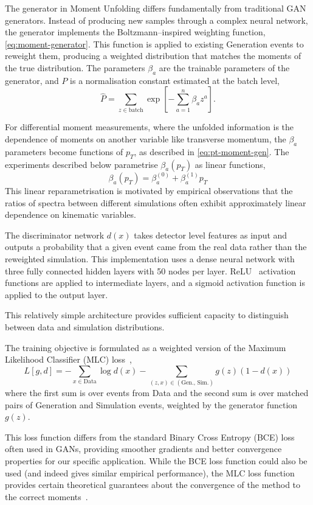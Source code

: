     The generator in Moment Unfolding differs fundamentally from traditional GAN generators.
    Instead of producing new samples through a complex neural network, the generator implements the Boltzmann--inspired weighting function, \cref{eq:moment-generator}.
    This function is applied to existing Generation events to reweight them, producing a weighted distribution that matches the moments of the true distribution.
    The parameters $\beta_a$ are the trainable parameters of the generator, and $P$ is a normalisation constant estimated at the batch level,
    \[
        \hat P = \sum_{z \in \text{batch}} \exp\left[-\sum_{a=1}^n\beta_a z^a\right].
    \]

    For differential moment measurements, where the unfolded information is the dependence of moments on another variable like transverse momentum, the $\beta_a$ parameters become functions of $p_T$, as described in \cref{eq:pt-moment-gen}.
    The experiments described below parametrise $\beta_a(p_T)$ as linear functions, 
    \[
        \beta_a(p_T) = \beta_a^{(0)} + \beta_a^{(1)}p_T
    \]
    This linear reparametrisation is motivated by empirical observations that the ratios of spectra between different simulations often exhibit approximately linear dependence on kinematic variables.

    The discriminator network $d(x)$ takes detector level features as input and outputs a probability that a given event came from the real data rather than the reweighted simulation.
    This implementation uses a dense neural network with three fully connected hidden layers with 50 nodes per layer.
    ReLU~\cite{Householder1941ALemmas} activation functions are applied to intermediate layers, and a sigmoid activation function is applied to the output layer.

    This relatively simple architecture provides sufficient capacity to distinguish between data and simulation distributions.

    The training objective is formulated as a weighted version of the Maximum Likelihood Classifier (MLC) loss~\cite{Stoye2018Likelihood-freeEstimator},
    \[
        \label{eq:numericloss}
        L[g,d] = -\sum_{x \in \text{Data}} \log d(x) - \sum_{(z,x) \in (\text{Gen., Sim.})} g(z)(1-d(x))
    \]
    where the first sum is over events from Data and the second sum is over matched pairs of Generation and Simulation events, weighted by the generator function $g(z)$.

    This loss function differs from the standard Binary Cross Entropy (BCE) loss often used in GANs, providing smoother gradients and better convergence properties for our specific application.
    While the BCE loss function could also be used (and indeed gives similar empirical performance), the MLC loss function provides certain theoretical guarantees about the convergence of the method to the correct moments~\cite{desai2024moment}.
